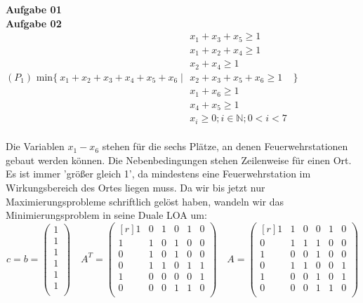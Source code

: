 \documentclass[a4paper,10pt]{article}
\begin{document}
	\parindent0pt
	\textbf{Aufgabe 01}\\
	
	\textbf{Aufgabe 02}\\
	
	$(P_1) \text{ min} \{\ x_1+x_2+x_3+x_4+x_5+x_6 \mid 
	\begin{matrix}
	x_1 + x_3 + x_5 \geq 1\\
	x_1 + x_2 + x_4 \geq 1\\
	x_2 + x_4 \geq 1\\
	x_2 + x_3 + x_5 + x_6 \geq 1\\
	x_1 + x_6 \geq 1\\
	x_4 + x_5 \geq 1 \\
	x_i \geq 0; i\in \mathbb{N}; 0<i<7
		\end{matrix}
	\ \}$
	\\\\
	Die Variablen $ x_1 - x_6 $ stehen für die sechs Plätze, an denen Feuerwehrstationen gebaut werden können. Die Nebenbedingungen stehen Zeilenweise für einen Ort. Es ist immer 'größer gleich 1', da mindestens eine Feuerwehrstation im Wirkungsbereich des Ortes liegen muss. Da wir bis jetzt nur Maximierungsprobleme schriftlich gelöst haben, wandeln wir das Minimierungsproblem in seine Duale LOA um:
	\[
	c = b = 
	\begin{pmatrix}
	1\\
	1\\
	1\\
	1\\
	1\\
	1\\
	\end{pmatrix}
	\quad
	A^T =
	\begin{pmatrix*}[r]
	1 & 0 & 1 & 0 & 1 & 0\\
	1 & 1 & 0 & 1 & 0 & 0\\
	0 & 1 & 0 & 1 & 0 & 0\\
	0 & 1 & 1 & 0 & 1 & 1\\
	1 & 0 & 0 & 0 & 0 & 1\\
	0 & 0 & 0 & 1 & 1 & 0\\
	\end{pmatrix*}
	\quad
	A = 
	\begin{pmatrix*}[r]
	1 & 1 & 0 & 0 & 1 & 0\\
	0 & 1 & 1 & 1 & 0 & 0\\
	1 & 0 & 0 & 1 & 0 & 0\\
	0 & 1 & 1 & 0 & 0 & 1\\
	1 & 0 & 0 & 1 & 0 & 1\\
	0 & 0 & 0 & 1 & 1 & 0\\
	
	\end{pmatrix*}
	\] \\
\end{document}

